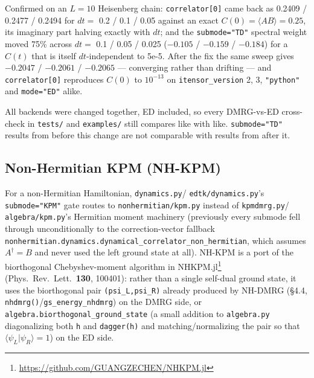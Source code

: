 \documentclass[11pt]{article}
\begin{document}
Confirmed on an $L=10$ Heisenberg chain: \texttt{correlator[0]} came back
as 0.2409 / 0.2477 / 0.2494 for $dt=$ 0.2 / 0.1 / 0.05 against an exact
$C(0)=\langle AB\rangle=0.25$, its imaginary part halving exactly with
$dt$; and the \texttt{submode="TD"} spectral weight moved 75\% across
$dt=$ 0.1 / 0.05 / 0.025 ($-0.105$ / $-0.159$ / $-0.184$) for a $C(t)$
that is itself $dt$-independent to 5e-5. After the fix the same sweep
gives $-0.2047$ / $-0.2061$ / $-0.2065$ --- converging rather than
drifting --- and \texttt{correlator[0]} reproduces $C(0)$ to $10^{-13}$
on \texttt{itensor\_version} 2, 3, \texttt{"python"} and
\texttt{mode="ED"} alike.

All backends were changed together, ED included, so every DMRG-vs-ED
cross-check in \texttt{tests/} and \texttt{examples/} still compares like
with like. \texttt{submode="TD"} results from before this change are not
comparable with results from after it.

\subsection{Non-Hermitian KPM (NH-KPM)}

For a non-Hermitian Hamiltonian, \texttt{dynamics.py}/
\texttt{edtk/dynamics.py}'s \texttt{submode="KPM"} gate routes to
\texttt{nonhermitian/kpm.py} instead of \texttt{kpmdmrg.py}/
\texttt{algebra/kpm.py}'s Hermitian moment machinery (previously every
submode fell through unconditionally to the correction-vector fallback
\texttt{nonhermitian.dynamics.dynamical\_correlator\_non\_hermitian},
which assumes $A^\dagger=B$ and never used the left ground state at
all). NH-KPM is a port of the biorthogonal Chebyshev-moment algorithm in
NHKPM.jl\footnote{\url{https://github.com/GUANGZECHEN/NHKPM.jl}}
(Phys.\ Rev.\ Lett.\ \textbf{130}, 100401): rather than a single
self-dual ground state, it uses the biorthogonal pair
\texttt{(psi\_L,psi\_R)} already produced by NH-DMRG (\S4.4,
\texttt{nhdmrg()}/\texttt{gs\_energy\_nhdmrg}) on the DMRG side, or
\texttt{algebra.biorthogonal\_ground\_state} (a small addition to
\texttt{algebra.py} diagonalizing both \texttt{h} and
\texttt{dagger(h)} and matching/normalizing the pair so that
$\langle\psi_L|\psi_R\rangle=1$) on the ED side.
\end{document}
